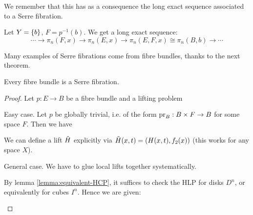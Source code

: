 We remember that this has as a consequence the long exact sequence associated to a Serre fibration.

\begin{theorem}
Let $Y=\{b\}$, $F=p^{-1}(b)$. We get a long exact sequence:
\[\cdots\to\pi_n(F,x)\to\pi_n(E,x)\to\pi_n(E,F,x)\cong\pi_n(B,b)\to\cdots\]
\end{theorem}

Many examples of Serre fibrations come from fibre bundles, thanks to the next theorem.

\begin{theorem}
Every fibre bundle is a Serre fibration.
\end{theorem}

\begin{proof}
Let $p:E\to B$ be a fibre bundle and a lifting problem
\begin{center}
\end{center}

Easy case. Let $p$ be globally trivial, i.e. of the form $\operatorname{pr}_B:B\times F\to B$ for some space $F$. Then we have
\begin{center}
\end{center}
We can define a lift $\tilde H$ explicitly via $\tilde H(x,t)=(H(x,t),f_2(x))$ (this works for any space $X$).

General case. We have to glue local lifts together systematically.

By lemma \ref{lemma:equivalent-HCP}, it suffices to check the HLP for disks $D^n$, or equivalently for cubes $I^n$. Hence we are given:
\begin{center}
\end{center}


\end{proof}

